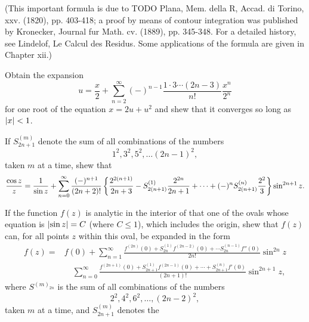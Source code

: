 \begin{wandwmiscexamples}
\begin{wandwmiscexample}
    (This important formula is due to TODO Plana, Mem. della R, Accad. di
    Torino, xxv. (1820), pp. 403-418; a proof by means of contour
    integration was published by Kronecker, Journal fur Math. cv. (1889),
    pp. 345-348. For a detailed history, see Lindelof, Le Calcul des
    Residus. Some applications of the formula are given in Chapter xii.)
  \end{wandwmiscexample}
  \begin{wandwmiscexample}
    Obtain the expansion
    $$
    u
    =
    \frac{x}{2}
    +
    \sum_{n=2}^{\infty}
    (-)^{n-1}
    \frac{1 \cdot 3 \cdots (2n-3)}{n!}
    \frac{x^{n}}{2^{n}}
    $$
    for one root of the equation
    $x = 2u + u^{2}$ and shew that it converges so
    long as $\left| x \right| < 1$.
  \end{wandwmiscexample}
  \begin{wandwmiscexample}
    If $S^{(m)}_{2n+1}$ denote the sum of all combinations of the numbers
    $$
    1^{2}, 3^{2}, 5^{2}, \ldots (2n-1)^{2},
    $$
    taken $m$ at a time, shew that
    $$
    \frac{\cos z}{z}
    =
    \frac{1}{\sin z}
    +
    \sum_{n=0}^{\infty}
    \frac{(-)^{n+1}}{(2n+2)!}
    \left\{ 
      \frac{2^{2(n+1)}}{2n+3}
      -
      S^{(1)}_{2(n+1)}
      \frac{2^{2n}}{2n+1}
      +
      \cdots
      +
      (-)^{n}
      S^{(n)}_{2(n+1)}
      \frac{2^{2}}{3}
     \right\}
    \sin^{2n+1} z.
    $$
  \end{wandwmiscexample}
  \begin{wandwmiscexample}
    If the function $f(z)$ is analytic in the interior of that one of
    the ovals whose equation is $\left| \sin z \right| = C$
    (where $C \leq 1$), which includes the origin, shew that $f(z)$
    can, for all points $z$ within this oval, be
    expanded in the form
    \begin{align*}
      f(z)
      =&
      f(0)
      +
      \sum_{n=1}^{\infty}
      \frac{ f^{(2n)}(0)
        + S^{(1)}_{2n} f^{(2n-2)}(0)
        + \cdots
        S^{(n-1)}_{2n} f''(0)
      }{2n!}
      \sin^{2n} z
      \\
      &
      \quad
      \sum_{n=0}^{\infty}
      \frac{
        f^{(2n+1)}(0)
        + S^{(1)}_{2n+1} f^{(2n-1)}(0)
        + \cdots
        + S^{(n)}_{2n+1} f'(0)
      }{(2n+1)!}
      \sin^{2n+1} z,
    \end{align*}
    where $S^{(m)_{2n}}$ is the sum of all combinations of the numbers
    $$
    2^{2}, 4^{2}, 6^{2}, \ldots, (2n-2)^{2},
    $$
    taken $m$ at a time, and $S^{(m)}_{2n+1}$ denotes the

\end{wandwmiscexample}
\end{wandwmiscexamples}
